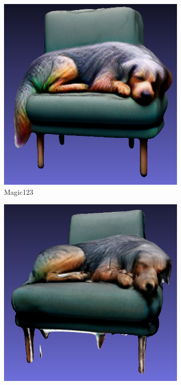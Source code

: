 \begin{figure}[ht]
    \begin{subfigure}[b]{0.267\textwidth}
        \centering
        \includegraphics[width=\textwidth]{figures/subjective/magic123_dog_front_result.png}
        \caption{Magic123}
        \vspace{0.1cm}
    \end{subfigure}
    \begin{subfigure}[b]{0.27\textwidth}
        \centering
        \includegraphics[width=\textwidth]{figures/subjective/wonder3D_dog_front_result.png}

\end{subfigure}
\end{figure}
